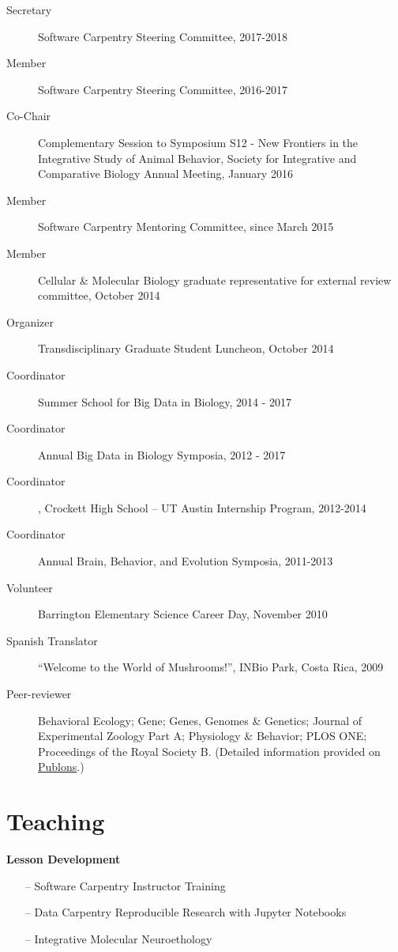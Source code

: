 \documentclass[margin,line]{resume}
\begin{document}
\begin{resume}
\begin{description}
\item[Secretary] Software Carpentry Steering Committee, 2017-2018
\item[Member] Software Carpentry Steering Committee, 2016-2017
\item[Co-Chair] Complementary Session to Symposium S12 - New Frontiers in the Integrative Study of Animal Behavior, Society for Integrative and Comparative Biology Annual Meeting, January 2016
\item[Member] Software Carpentry Mentoring Committee, since March 2015
\item[Member] Cellular \& Molecular Biology graduate representative for external review committee, October 2014 
\item[Organizer] Transdisciplinary Graduate Student Luncheon, October 2014
\item[Coordinator] Summer School for Big Data in Biology, 2014 - 2017
\item[Coordinator] Annual Big Data in Biology Symposia, 2012 - 2017 
\item[Coordinator] , Crockett High School – UT Austin Internship Program, 2012-2014
\item[Coordinator] Annual Brain, Behavior, and Evolution Symposia, 2011-2013
\item[Volunteer] Barrington Elementary Science Career Day, November 2010
\item[Spanish Translator] “Welcome to the World of Mushrooms!”, INBio Park, Costa Rica, 2009
\item[Peer-reviewer] Behavioral Ecology; Gene; Genes, Genomes \& Genetics; Journal of Experimental Zoology Part A; Physiology \& Behavior; PLOS ONE; Proceedings of the Royal Society B. (Detailed information provided on \href{https://publons.com/author/444397/rayna-harris#profile)}{Publons}.) 
\end{description}

    
\section{\mysidestyle Teaching}

{\bf Lesson Development}
\begin{itemize}
\raggedright
\item[--] Software Carpentry Instructor Training
\item[--] Data Carpentry Reproducible Research with Jupyter Notebooks
\item[--] Integrative Molecular Neuroethology


\end{itemize}
\end{resume}
\end{document}
